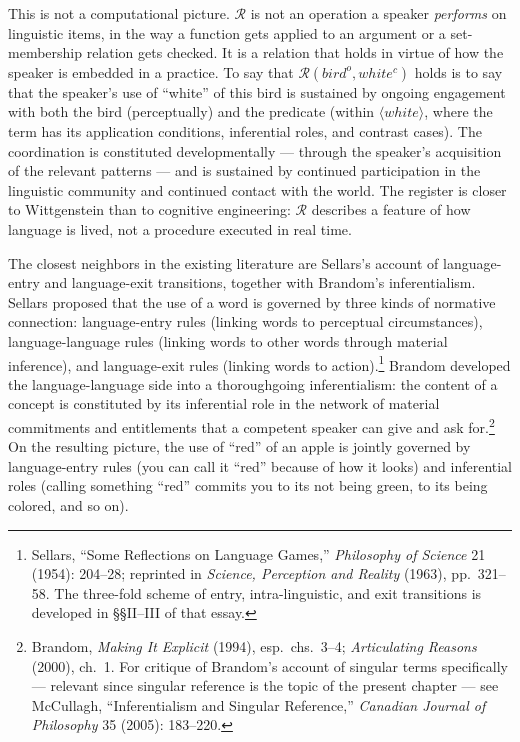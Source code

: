 \documentclass[10pt]{article}
\begin{document}
This is not a computational picture. \(\mathcal{R}\) is not an operation a speaker \emph{performs} on linguistic items, in the way a function gets applied to an argument or a set-membership relation gets checked. It is a relation that holds in virtue of how the speaker is embedded in a practice. To say that \(\mathcal{R}(bird^o, white^c)\) holds is to say that the speaker's use of ``white'' of this bird is sustained by ongoing engagement with both the bird (perceptually) and the predicate (within \(\langle white \rangle\), where the term has its application conditions, inferential roles, and contrast cases). The coordination is constituted developmentally --- through the speaker's acquisition of the relevant patterns --- and is sustained by continued participation in the linguistic community and continued contact with the world. The register is closer to Wittgenstein than to cognitive engineering: \(\mathcal{R}\) describes a feature of how language is lived, not a procedure executed in real time.

The closest neighbors in the existing literature are Sellars's account of language-entry and language-exit transitions, together with Brandom's inferentialism. Sellars proposed that the use of a word is governed by three kinds of normative connection: language-entry rules (linking words to perceptual circumstances), language-language rules (linking words to other words through material inference), and language-exit rules (linking words to action).\footnote{Sellars, ``Some Reflections on Language Games,'' \emph{Philosophy of Science} 21 (1954): 204--28; reprinted in \emph{Science, Perception and Reality} (1963), pp.~321--58. The three-fold scheme of entry, intra-linguistic, and exit transitions is developed in §§II--III of that essay.} Brandom developed the language-language side into a thoroughgoing inferentialism: the content of a concept is constituted by its inferential role in the network of material commitments and entitlements that a competent speaker can give and ask for.\footnote{Brandom, \emph{Making It Explicit} (1994), esp.~chs.~3--4; \emph{Articulating Reasons} (2000), ch.~1. For critique of Brandom's account of singular terms specifically --- relevant since singular reference is the topic of the present chapter --- see McCullagh, ``Inferentialism and Singular Reference,'' \emph{Canadian Journal of Philosophy} 35 (2005): 183--220.} On the resulting picture, the use of ``red'' of an apple is jointly governed by language-entry rules (you can call it ``red'' because of how it looks) and inferential roles (calling something ``red'' commits you to its not being green, to its being colored, and so on).
\end{document}
